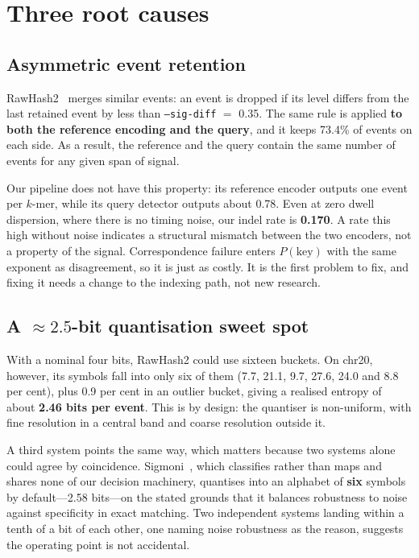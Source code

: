 \documentclass[conference]{IEEEtran}
\begin{document}
\section{Three root causes}
\label{sec:causes}

\subsection{Asymmetric event retention}

RawHash2~\cite{rawhash2} merges similar events: an event is dropped if its level differs
from the last retained
event by less than \texttt{--sig-diff} $=$ 0.35. The same rule is applied \textbf{to both the
reference encoding and the query}, and it keeps 73.4\% of events on each side. As a result, the
reference and the query contain the same number of events for any given span of signal.

Our pipeline does not have this property: its reference encoder outputs one event per $k$-mer,
while its query detector outputs about 0.78. Even at zero dwell dispersion, where there is no
timing noise, our indel rate is \textbf{0.170}. A rate this high
without noise indicates a structural mismatch between the two encoders, not a property of the
signal. Correspondence failure enters $P(\mathrm{key})$ with the same exponent as disagreement,
so it is just as costly. It is the first problem to fix, and fixing it needs a change to the
indexing path, not new research.

\subsection{A ${\approx}2.5$-bit quantisation sweet spot}

With a nominal four bits, RawHash2 could use sixteen buckets. On chr20, however, its symbols
fall into only six of them (7.7, 21.1, 9.7, 27.6, 24.0 and 8.8 per cent), plus 0.9 per cent in
an outlier bucket, giving a realised entropy of about \textbf{2.46 bits per event}. This is by
design: the quantiser is non-uniform, with fine resolution in a central band and coarse
resolution outside it.

A third system points the same way, which matters because two systems alone could agree by
coincidence.
Sigmoni~\cite{sigmoni}, which classifies rather than maps and shares none of our decision
machinery, quantises into an alphabet of \textbf{six} symbols by default---2.58 bits---on the
stated grounds that it balances robustness to noise against specificity in exact matching. Two
independent systems landing within a tenth of a bit of each other, one naming noise robustness
as the reason, suggests the operating point is not accidental.
\end{document}
